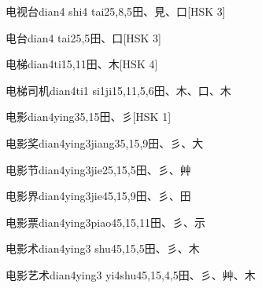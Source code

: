 \begin{entry}{电视台}{dian4 shi4 tai2}{5,8,5}{⽥、⾒、⼝}[HSK 3]
\end{entry}

\begin{entry}{电台}{dian4 tai2}{5,5}{⽥、⼝}[HSK 3]
\end{entry}

\begin{entry}{电梯}{dian4ti1}{5,11}{⽥、⽊}[HSK 4]
\end{entry}

\begin{entry}{电梯司机}{dian4ti1 si1ji1}{5,11,5,6}{⽥、⽊、⼝、⽊}
\end{entry}

\begin{entry}{电影}{dian4ying3}{5,15}{⽥、⼺}[HSK 1]
\end{entry}

\begin{entry}{电影奖}{dian4ying3jiang3}{5,15,9}{⽥、⼺、⼤}
\end{entry}

\begin{entry}{电影节}{dian4ying3jie2}{5,15,5}{⽥、⼺、⾋}
\end{entry}

\begin{entry}{电影界}{dian4ying3jie4}{5,15,9}{⽥、⼺、⽥}
\end{entry}

\begin{entry}{电影票}{dian4ying3piao4}{5,15,11}{⽥、⼺、⽰}
\end{entry}

\begin{entry}{电影术}{dian4ying3 shu4}{5,15,5}{⽥、⼺、⽊}
\end{entry}

\begin{entry}{电影艺术}{dian4ying3 yi4shu4}{5,15,4,5}{⽥、⼺、⾋、⽊}
\end{entry}

